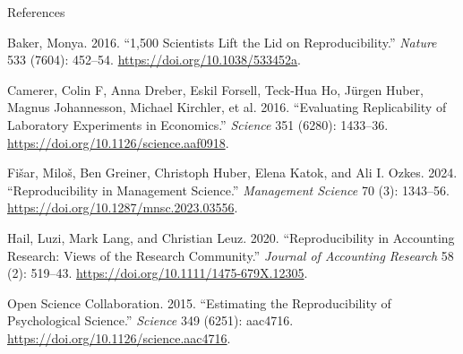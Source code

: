 \documentclass[
  ignorenonframetext,
  aspectratio=169,
]{beamer}
\newlength{\cslhangindent}
\newenvironment{CSLReferences}[2] %
 {\begin{list}{}{%
  \setlength{\itemindent}{0pt}
  \setlength{\leftmargin}{0pt}
  \setlength{\parsep}{0pt}
  \ifodd #1
   \setlength{\leftmargin}{\cslhangindent}
   \setlength{\itemindent}{-1\cslhangindent}
  \fi
  \setlength{\itemsep}{#2\baselineskip}}}
 {\end{list}}
\begin{document}
\begin{frame}[allowframebreaks]{References}
\label{references}
\footnotesize

\label{refs}
\begin{CSLReferences}{1}{0}
Baker, Monya. 2016. {``1,500 Scientists Lift the Lid on
Reproducibility.''} \emph{Nature} 533 (7604): 452--54.
\url{https://doi.org/10.1038/533452a}.

Camerer, Colin F, Anna Dreber, Eskil Forsell, Teck-Hua Ho, Jürgen Huber,
Magnus Johannesson, Michael Kirchler, et al. 2016. {``Evaluating
Replicability of Laboratory Experiments in Economics.''} \emph{Science}
351 (6280): 1433--36. \url{https://doi.org/10.1126/science.aaf0918}.

Fišar, Miloš, Ben Greiner, Christoph Huber, Elena Katok, and Ali I.
Ozkes. 2024. {``Reproducibility in Management Science.''}
\emph{Management Science} 70 (3): 1343--56.
\url{https://doi.org/10.1287/mnsc.2023.03556}.

Hail, Luzi, Mark Lang, and Christian Leuz. 2020. {``Reproducibility in
Accounting Research: Views of the Research Community.''} \emph{Journal
of Accounting Research} 58 (2): 519--43.
\url{https://doi.org/10.1111/1475-679X.12305}.

Open Science Collaboration. 2015. {``Estimating the Reproducibility of
Psychological Science.''} \emph{Science} 349 (6251): aac4716.
\url{https://doi.org/10.1126/science.aac4716}.

\end{CSLReferences}
\end{frame}
\end{document}

